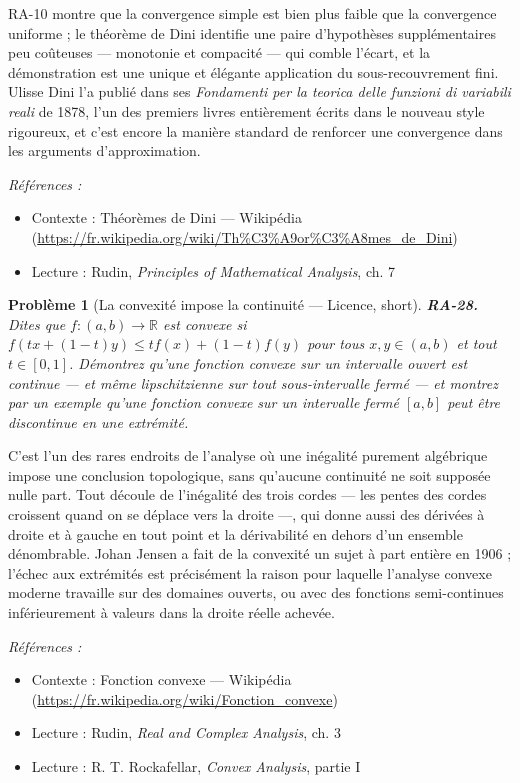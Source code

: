 \documentclass[11pt]{article}
\newtheorem{problem}{Problème}
\newenvironment{refs}{\par\small\noindent\emph{Références :}\begin{itemize}\setlength\itemsep{0pt}}{\end{itemize}\normalsize}
\begin{document}
\noindent RA-10 montre que la convergence simple est bien plus faible que la convergence
uniforme ; le théorème de Dini identifie une paire d'hypothèses supplémentaires peu coûteuses ---
monotonie et compacité --- qui comble l'écart, et la démonstration est une unique et élégante
application du sous-recouvrement fini. Ulisse Dini l'a publié dans ses \textit{Fondamenti per la teorica
delle funzioni di variabili reali} de 1878, l'un des premiers livres entièrement écrits dans le
nouveau style rigoureux, et c'est encore la manière standard de renforcer une convergence dans les
arguments d'approximation.

\begin{refs}
\item Contexte : Théorèmes de Dini --- Wikipédia (\url{https://fr.wikipedia.org/wiki/Th%C3%A9or%C3%A8mes_de_Dini})
\item Lecture : Rudin, \textit{Principles of Mathematical Analysis}, ch. 7
\end{refs}

\bigskip

\begin{problem}[{La convexité impose la continuité --- Licence, short}]
\textbf{RA-28.} Dites que $ f : (a,b) \to \mathbb{R} $ est \textit{convexe} si
$ f(t x + (1-t) y) \le t f(x) + (1-t) f(y) $ pour tous $ x, y \in (a,b) $ et tout
$ t \in [0,1] $. Démontrez qu'une fonction convexe sur un intervalle ouvert est continue --- et même
lipschitzienne sur tout sous-intervalle fermé --- et montrez par un exemple qu'une fonction convexe
sur un intervalle fermé $ [a,b] $ peut être discontinue en une extrémité.
\end{problem}

\noindent C'est l'un des rares endroits de l'analyse où une inégalité purement algébrique
impose une conclusion topologique, sans qu'aucune continuité ne soit supposée nulle part. Tout
découle de l'inégalité des trois cordes --- les pentes des cordes croissent quand on se déplace vers
la droite ---, qui donne aussi des dérivées à droite et à gauche en tout point et la dérivabilité en
dehors d'un ensemble dénombrable. Johan Jensen a fait de la convexité un sujet à part entière en
1906 ; l'échec aux extrémités est précisément la raison pour laquelle l'analyse convexe moderne
travaille sur des domaines ouverts, ou avec des fonctions semi-continues inférieurement à valeurs
dans la droite réelle achevée.

\begin{refs}
\item Contexte : Fonction convexe --- Wikipédia (\url{https://fr.wikipedia.org/wiki/Fonction_convexe})
\item Lecture : Rudin, \textit{Real and Complex Analysis}, ch. 3
\item Lecture : R. T. Rockafellar, \textit{Convex Analysis}, partie I
\end{refs}
\end{document}
